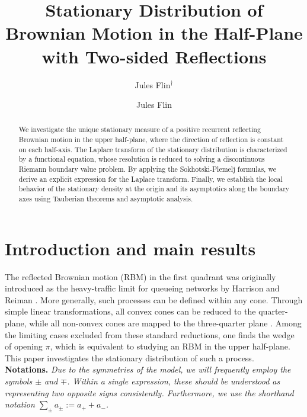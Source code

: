 \documentclass{article}
\author{Jules Flin$^\dagger$}
\title{Stationary Distribution of Brownian Motion in the Half-Plane with Two-sided Reflections}
\author{Jules Flin}
\affil{SAMOVAR, Télécom SudParis, Institut Polytechnique de Paris, 92120 Palaiseau, France}
\date{}
\theoremstyle{plain}
\theoremstyle{definition}
\theoremstyle{remark}
\begin{document}
\maketitle
\begin{abstract}
We investigate the unique stationary measure of a positive recurrent reflecting Brownian motion in the upper half-plane, where the direction of reflection is constant on each half-axis. The Laplace transform of the stationary distribution is characterized by a functional equation, whose resolution is reduced to solving a discontinuous Riemann boundary value problem. By applying the Sokhotski-Plemelj formulas, we derive an explicit expression for the Laplace transform. Finally, we establish the local behavior of the stationary density at the origin and its asymptotics along the boundary axes using Tauberian theorems and asymptotic analysis.
\end{abstract}


\section{Introduction and main results}

The reflected Brownian motion (RBM) in the first quadrant was originally introduced as the heavy-traffic limit for queueing networks by Harrison and Reiman \cite{Harrison_1978,Reiman_1984}. More generally, such processes can be defined within any cone. Through simple linear transformations, all convex cones can be reduced to the quarter-plane, while all non-convex cones are mapped to the three-quarter plane \cite{BoMe,threequarter}. Among the limiting cases excluded from these standard reductions, one finds the wedge of opening $\pi$, which is equivalent to studying an RBM in the upper half-plane. This paper investigates the stationary distribution of such a process.\\



\noindent \textbf{Notations.} \textit{Due to the symmetries of the model, we will frequently employ the symbols $\pm$ and $\mp$. Within a single expression, these should be understood as representing two opposite signs consistently. Furthermore, we use the shorthand notation $\sum_{\pm}a_{\pm} := a_+ + a_-$.}
\end{document}
